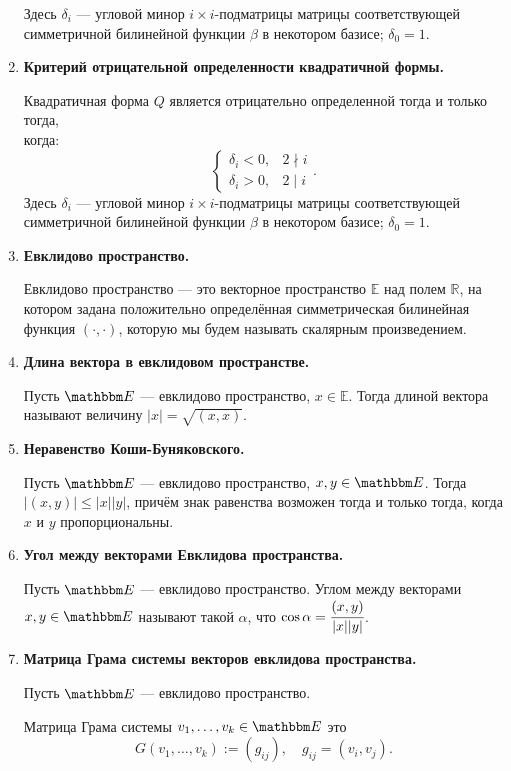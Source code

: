 \begin{enumerate}
Здесь $\delta_i$ --- угловой минор $i\times i$-подматрицы матрицы соответствующей симметричной билинейной функции $\beta$ в некотором базисе; $\delta_0 = 1$.

\item \textbf{Критерий отрицательной определенности квадратичной формы.}

Квадратичная форма $Q$ является отрицательно определенной тогда и только тогда,\\ когда:
$$
\begin{cases}
	\delta_i < 0, & 2 \nmid i \\
	\delta_i > 0, & 2 \mid i
\end{cases}.
$$
Здесь $\delta_i$ --- угловой минор $i\times i$-подматрицы матрицы соответствующей симметричной билинейной функции $\beta$ в некотором базисе; $\delta_0 = 1$.

\item \textbf{Евклидово пространство.}

Евклидово пространство --- это векторное пространство $\mathbb{E}$ над полем $\mathbb{R}$, на котором задана положительно определённая симметрическая билинейная функция $(\cdot, \cdot)$, которую мы будем называть скалярным произведением.

\item \textbf{Длина вектора в евклидовом пространстве.}

Пусть $\E$ --- евклидово пространство, $x\in \mathbb{E}$. Тогда длиной вектора называют величину $|x| = \sqrt{(x,x)}$.

\item \textbf{Неравенство Коши-Буняковского.}

Пусть $\E$ --- евклидово пространство, $x, y \in \E$. Тогда $|(x,y)| \leqslant |x||y|$, причём знак равенства возможен тогда и только тогда, когда $x$ и $y$ пропорциональны.

\item \textbf{Угол между векторами Евклидова пространства.}

Пусть $\E$ --- евклидово пространство. Углом между векторами $x, y \in \E$ называют такой $\alpha$, что $ \cos \alpha = \cfrac{(x,y)}{|x||y|}$.

\item \textbf{Матрица Грама системы векторов евклидова пространства.}

Пусть $\E$ --- евклидово пространство.

Матрица Грама системы $v_1, \ldots, v_k \in \E$ это
	$$G(v_1,\ldots, v_k) := (g_{ij}),\quad g_{ij} = (v_i,v_j).$$


\end{enumerate}

